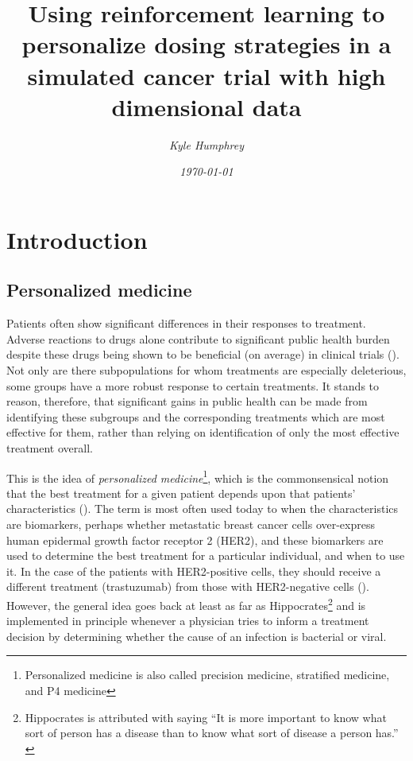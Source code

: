 \documentclass[12pt]{article}
\title{\normalfont \Large Using reinforcement learning to personalize dosing strategies in a simulated cancer trial with high dimensional data}
\author{\normalsize \sl Kyle Humphrey}
\date{\normalsize \sl \today}
\begin{document}
\maketitle

\tableofcontents
\listoffigures
\listoftables

\section{Introduction}

\subsection{Personalized medicine} %
\label{sub:personalized_medicine}


Patients often show significant differences in their responses to treatment. Adverse reactions to drugs alone contribute to significant public health burden despite these drugs being shown to be beneficial (on average) in clinical trials (\cite{Pirmohamed2004}). Not only are there subpopulations for whom treatments are especially deleterious, some groups have a more robust response to certain treatments. It stands to reason, therefore, that significant gains in public health can be made from identifying these subgroups and the corresponding treatments which are most effective for them, rather than relying on identification of only the most effective treatment overall.


This is the idea of \emph{personalized medicine}\footnote{Personalized medicine is also called precision medicine, stratified medicine, and P4 medicine}, which is the commonsensical notion that the best treatment for a given patient depends upon that patients' characteristics (\cite{pm-defn}). The term is most often used today to when the characteristics are biomarkers, perhaps whether metastatic breast cancer cells  over-express human epidermal growth factor receptor 2 (HER2), and these biomarkers are used to determine the best treatment for a particular individual, and when to use it. In the case of the patients with HER2-positive cells, they should receive a different treatment (trastuzumab) from those with HER2-negative cells (\cite{Baselga2006}).
However, the general idea goes back at least as far as Hippocrates\footnote{Hippocrates is attributed with saying “It is more important to know what sort of person has a disease than to know what sort of disease a person has.” \cite{Fischer2015}} and is implemented in principle whenever a physician tries to inform a treatment decision by determining whether the cause of an infection is bacterial or viral.
\end{document}
